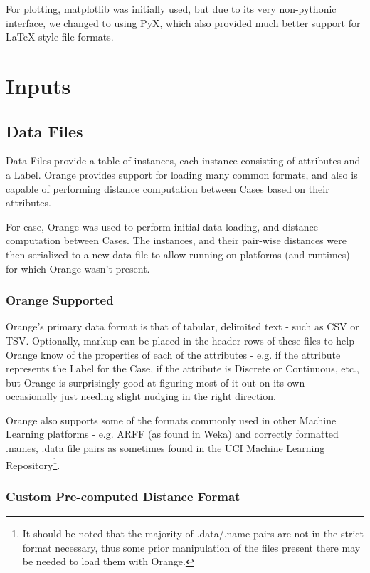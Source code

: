 \documentclass[a4paper,11pt]{report}
\begin{document}
For plotting, matplotlib\citep{prog:matplotlib} was initially used, but due to its very non-pythonic interface, we changed to using PyX\citep{prog:pyx}, which also provided much better support for LaTeX style file formats.

\section{Inputs}
\subsection{Data Files}
Data Files provide a table of instances, each instance consisting of attributes and a Label. Orange provides support for loading many common formats, and also is capable of performing distance computation between Cases based on their attributes.

For ease, Orange was used to perform initial data loading, and distance computation between Cases. The instances, and their pair-wise distances were then serialized to a new data file to allow running on platforms (and runtimes) for which Orange wasn't present.

\subsubsection{Orange Supported}
Orange's primary data format is that of tabular, delimited text - such as CSV or TSV. Optionally, markup can be placed in the header rows of these files to help Orange know of the properties of each of the attributes - e.g. if the attribute represents the Label for the Case, if the attribute is Discrete or Continuous, etc., but Orange is surprisingly good at figuring most of it out on its own - occasionally just needing slight nudging in the right direction.

Orange also supports some of the formats commonly used in other Machine Learning platforms - e.g. ARFF (as found in Weka) and correctly formatted .names, .data file pairs as sometimes found in the UCI Machine Learning Repository\citep{web:uci}\footnote{It should be noted that the majority of .data/.name pairs are not in the strict format necessary, thus some prior manipulation of the files present there may be needed to load them with Orange.}.

\subsubsection{Custom Pre-computed Distance Format}
\end{document}
